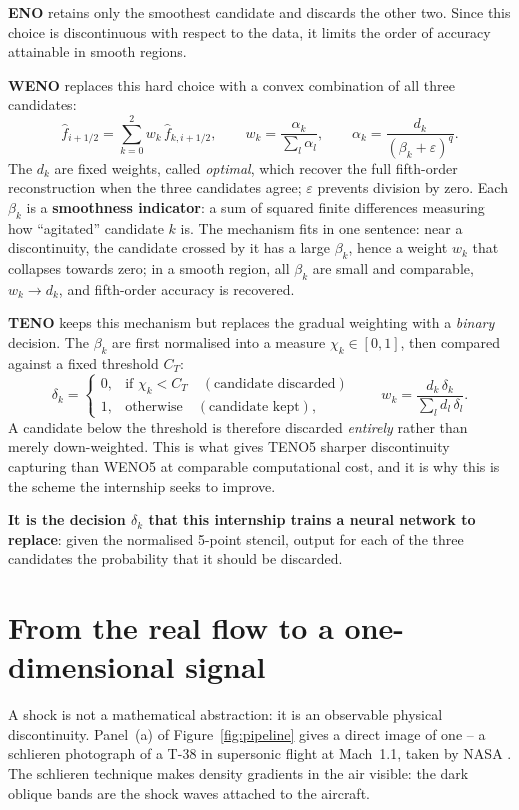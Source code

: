 \documentclass[12pt,a4paper,oneside]{report}
\begin{document}
\textbf{ENO} \cite{harten1987} retains only the smoothest candidate and
discards the other two. Since this choice is discontinuous with respect to the
data, it limits the order of accuracy attainable in smooth regions.

\textbf{WENO} \cite{jiang1996} replaces this hard choice with a convex
combination of all three candidates:
\[
\hat f_{i+1/2} = \sum_{k=0}^{2} w_k\, \hat f_{k,i+1/2}, \qquad
w_k = \frac{\alpha_k}{\sum_{l}\alpha_l}, \qquad
\alpha_k = \frac{d_k}{(\beta_k + \varepsilon)^{q}} .
\]
The $d_k$ are fixed weights, called \emph{optimal}, which recover the full
fifth-order reconstruction when the three candidates agree; $\varepsilon$
prevents division by zero. Each $\beta_k$ is a \textbf{smoothness indicator}: a
sum of squared finite differences measuring how ``agitated'' candidate $k$ is.
The mechanism fits in one sentence: near a discontinuity, the candidate crossed
by it has a large $\beta_k$, hence a weight $w_k$ that collapses towards zero;
in a smooth region, all $\beta_k$ are small and comparable, $w_k \to d_k$, and
fifth-order accuracy is recovered.

\textbf{TENO} \cite{fu2016} keeps this mechanism but replaces the gradual
weighting with a \emph{binary} decision. The $\beta_k$ are first normalised
into a measure $\chi_k \in [0,1]$, then compared against a fixed threshold
$C_T$:
\[
\delta_k = \begin{cases} 0, & \text{if } \chi_k < C_T \quad (\text{candidate discarded}) \\[2pt]
                         1, & \text{otherwise} \quad (\text{candidate kept}), \end{cases}
\qquad
w_k = \frac{d_k\,\delta_k}{\sum_{l}d_l\,\delta_l} .
\]
A candidate below the threshold is therefore discarded \emph{entirely} rather
than merely down-weighted. This is what gives TENO5 sharper discontinuity
capturing than WENO5 at comparable computational cost, and it is why this is
the scheme the internship seeks to improve.

\textbf{It is the decision $\delta_k$ that this internship trains a neural
network to replace}: given the normalised 5-point stencil, output for each of
the three candidates the probability that it should be discarded.

\section{From the real flow to a one-dimensional signal}

A shock is not a mathematical abstraction: it is an observable physical
discontinuity. Panel~(a) of Figure~\ref{fig:pipeline} gives a direct image of
one -- a schlieren photograph of a T-38 in supersonic flight at Mach~1.1, taken
by NASA \cite{nasa1993}. The schlieren technique makes density gradients in the
air visible: the dark oblique bands are the shock waves attached to the
aircraft.
\end{document}
